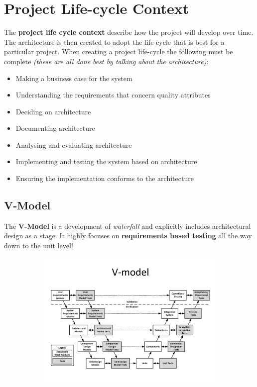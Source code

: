 \documentclass[a4paper]{report}
\begin{document}
\section{Project Life-cycle Context}
The \textbf{project life cycle context} describe how the project will develop over time. The architecture is then created to adopt the life-cycle that is best for a particular project. When creating a project life-cycle the following must be complete \textit{(these are all done best by talking about the architecture)}:
\begin{itemize}
\item Making a business case for the system
\item Understanding the requirements that concern quality attributes
\item Deciding on architecture
\item Documenting architecture
\item Analysing and evaluating architecture
\item Implementing and testing the system based on architecture
\item Ensuring the implementation conforms to the architecture
\end{itemize}

\subsection{V-Model}
The \textbf{V-Model} is a development of \textit{waterfall} and explicitly includes architectural design as a stage. It highly focuses on \textbf{requirements based testing} all the way down to the unit level!

\begin{figure}[H]
\hskip-2.5cm\begin{subfigure}{1.2\textwidth}
  \includegraphics[width=1.2\linewidth]
  {images/3-v-model.png}
\end{subfigure}
\end{figure}
\end{document}
